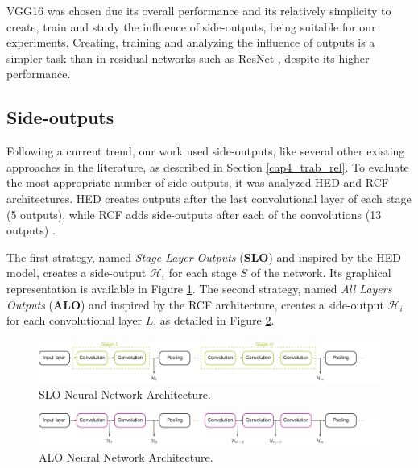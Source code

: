 VGG16 was chosen due its overall performance and its relatively simplicity to create, train and study the influence of side-outputs, being suitable for our experiments. 
Creating, training and analyzing the influence of outputs is a simpler task than in residual networks such as ResNet \cite{RESNET:2016:7780459}, despite its higher performance.

\subsection{Side-outputs}
\label{cap5_saidas_laterais}

Following a current trend, our work used side-outputs, like several other existing approaches in the literature, as described in Section \ref{cap4_trab_rel}.
To evaluate the most appropriate number of side-outputs, it was analyzed HED and RCF architectures.
HED creates outputs after the last convolutional layer of each stage (5 outputs), while RCF adds side-outputs after each of the convolutions (13 outputs) \cite{Xie:2017:HED:3158436.3158453} \cite{RCF:2017:8100105}.

The first strategy, named \textit{Stage Layer Outputs} (\textbf{SLO}) and inspired by the HED model, creates a side-output $\mathcal{H}_i$ for each stage $S$ of the network.
Its graphical representation is available in Figure \ref{fig:architecture_slo}.
The second strategy, named \textit{All Layers Outputs} (\textbf{ALO}) and inspired by the RCF architecture, creates a side-output $\mathcal{H}_i$ for each convolutional layer $L$, as detailed in Figure \ref{fig:architecture_alo}.

\begin{figure}
  \centering
  \includegraphics[width=1\textwidth]{../imagens/ilustracoes/cap6_arquitetura_slo.png} %
  \caption{SLO Neural Network Architecture.}
  \label{fig:architecture_slo}
\end{figure}

\begin{figure}
  \centering
  \includegraphics[width=1\textwidth]{../imagens/ilustracoes/cap6_arquitetura_alo.png} %
  \caption{ALO Neural Network Architecture.}
  \label{fig:architecture_alo}
\end{figure}

